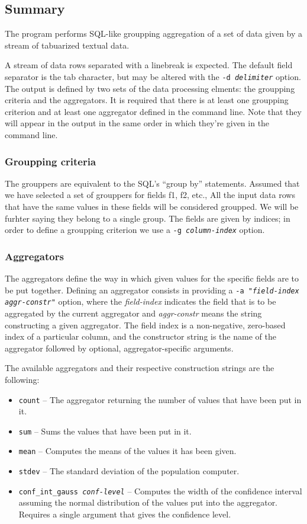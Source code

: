 \documentclass{report}
\begin{document}
\subsection{Summary}
The program performs SQL-like groupping aggregation of a set of data given by a
stream of tabuarized textual data.

A stream of data rows separated with a linebreak is expected. The default
field separator is the tab character, but may be altered with the
\texttt{-d \textit{delimiter}} option. The output is defined by two sets
of the data processing elments: the groupping criteria and the aggregators.
It is required that there is at least one groupping criterion and at least one
aggregator defined in the command line. Note that they will appear in the output
in the same order in which they're given in the command line.

\subsubsection{Groupping criteria}
The grouppers are equivalent to the SQL's ``group by'' statements.
Assumed that we have selected a set of grouppers for fields f1, f2, etc.,
All the input data rows that have the same values in these fields will be
considered groupped. We will be furhter saying they belong to a single group.
The fields are given by indices; in order to define a groupping criterion we use
a \texttt{-g \textit{column-index}} option.

\subsubsection{Aggregators}
The aggregators define the way in which given values for the specific fields
are to be put together. Defining an aggregator consists in providing a
\texttt{-a "\textit{field-index} \textit{aggr-constr}"} option, where the
\textit{field-index} indicates the field that is to be aggregated by the
current aggregator and \textit{aggr-constr} means the string constructing
a given aggregator. The field index is a non-negative, zero-based index
of a particular column, and the constructor string is the name of the
aggregator followed by optional, aggregator-specific arguments.

The available aggregators and their respective construction strings are
the following:
\begin{itemize}
	\item \texttt{count} -- The aggregator returning the number of values
		that have been put in it.
	\item \texttt{sum} -- Sums the values that have been put in it.
	\item \texttt{mean} -- Computes the means of the values it has been
		given.
	\item \texttt{stdev} -- The standard deviation of the population
		computer.
	\item \texttt{conf\_int\_gauss \textit{conf-level}} -- Computes
		the width of the confidence interval assuming the normal
		distribution of the values put into the aggregator.
		Requires a single argument that gives the confidence
		level.
\end{itemize}
\end{document}
